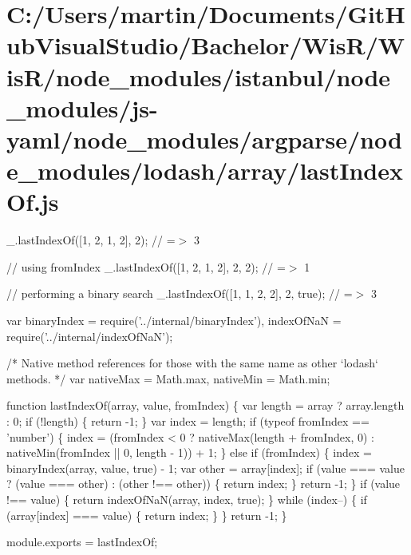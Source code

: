 \hypertarget{_c_1_2_users_2martin_2_documents_2_git_hub_visual_studio_2_bachelor_2_wis_r_2_wis_r_2node_module8a0ffebb6b52ec463cc354dbe82730c3}{}\section{C\+:/\+Users/martin/\+Documents/\+Git\+Hub\+Visual\+Studio/\+Bachelor/\+Wis\+R/\+Wis\+R/node\+\_\+modules/istanbul/node\+\_\+modules/js-\/yaml/node\+\_\+modules/argparse/node\+\_\+modules/lodash/array/last\+Index\+Of.\+js}
\+\_\+.\+last\+Index\+Of(\mbox{[}1, 2, 1, 2\mbox{]}, 2); // =$>$ 3

// using {\ttfamily from\+Index} \+\_\+.\+last\+Index\+Of(\mbox{[}1, 2, 1, 2\mbox{]}, 2, 2); // =$>$ 1

// performing a binary search \+\_\+.\+last\+Index\+Of(\mbox{[}1, 1, 2, 2\mbox{]}, 2, true); // =$>$ 3


\begin{DoxyCodeInclude}
var binaryIndex = require(\textcolor{stringliteral}{'../internal/binaryIndex'}),
    indexOfNaN = require(\textcolor{stringliteral}{'../internal/indexOfNaN'});

\textcolor{comment}{/* Native method references for those with the same name as other `lodash` methods. */}
var nativeMax = Math.max,
    nativeMin = Math.min;

\textcolor{keyword}{function} lastIndexOf(array, value, fromIndex) \{
  var length = array ? array.length : 0;
  \textcolor{keywordflow}{if} (!length) \{
    \textcolor{keywordflow}{return} -1;
  \}
  var index = length;
  \textcolor{keywordflow}{if} (typeof fromIndex == \textcolor{stringliteral}{'number'}) \{
    index = (fromIndex < 0 ? nativeMax(length + fromIndex, 0) : nativeMin(fromIndex || 0, length - 1)) + 1;
  \} \textcolor{keywordflow}{else} \textcolor{keywordflow}{if} (fromIndex) \{
    index = binaryIndex(array, value, \textcolor{keyword}{true}) - 1;
    var other = array[index];
    \textcolor{keywordflow}{if} (value === value ? (value === other) : (other !== other)) \{
      \textcolor{keywordflow}{return} index;
    \}
    \textcolor{keywordflow}{return} -1;
  \}
  \textcolor{keywordflow}{if} (value !== value) \{
    \textcolor{keywordflow}{return} indexOfNaN(array, index, \textcolor{keyword}{true});
  \}
  \textcolor{keywordflow}{while} (index--) \{
    \textcolor{keywordflow}{if} (array[index] === value) \{
      \textcolor{keywordflow}{return} index;
    \}
  \}
  \textcolor{keywordflow}{return} -1;
\}

module.exports = lastIndexOf;
\end{DoxyCodeInclude}
 